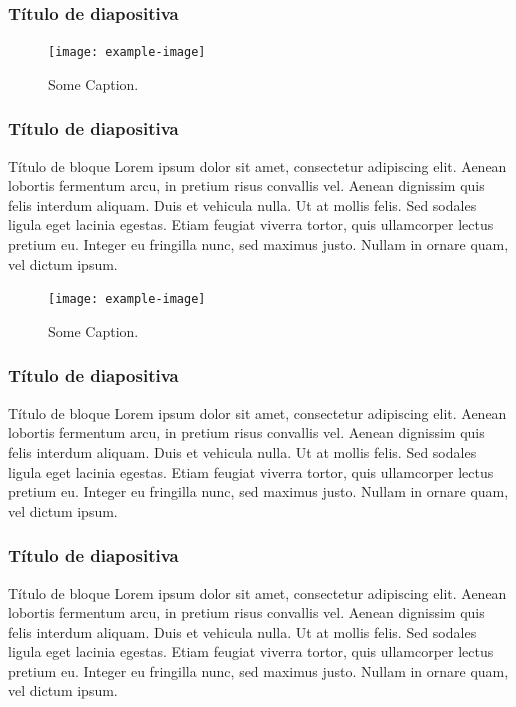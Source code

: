 \documentclass[10pt]{beamer}
\begin{document}
\begin{frame}
  \frametitle{Título de diapositiva}
    \begin{figure}[hbtp]
	    \centering
	    \texttt{[image: example-image]}
        \caption{Some Caption.}
    \end{figure}
\end{frame}

\begin{frame}
    \frametitle{Título de diapositiva}
    \begin{block}{Título de bloque}
        \justifying
        Lorem ipsum dolor sit amet, consectetur adipiscing elit. Aenean lobortis fermentum arcu, in pretium risus convallis vel. Aenean dignissim quis felis interdum aliquam. Duis et vehicula nulla. Ut at mollis felis. Sed sodales ligula eget lacinia egestas. Etiam feugiat viverra tortor, quis ullamcorper lectus pretium eu. Integer eu fringilla nunc, sed maximus justo. Nullam in ornare quam, vel dictum ipsum.
        
        \begin{figure}[hbtp]
	        \centering
	        \texttt{[image: example-image]}
            \caption{Some Caption.}
        \end{figure}
	\end{block}
\end{frame}

\begin{frame}
    \frametitle{Título de diapositiva}
    \begin{block}{Título de bloque}
        \justifying
        Lorem ipsum dolor sit amet, consectetur adipiscing elit. Aenean lobortis fermentum arcu, in pretium risus convallis vel. Aenean dignissim quis felis interdum aliquam. Duis et vehicula nulla. Ut at mollis felis. Sed sodales ligula eget lacinia egestas. Etiam feugiat viverra tortor, quis ullamcorper lectus pretium eu. Integer eu fringilla nunc, sed maximus justo. Nullam in ornare quam, vel dictum ipsum.
	\end{block}
\end{frame}

\begin{frame}
    \frametitle{Título de diapositiva}
    \begin{block}{Título de bloque}
        \justifying
        Lorem ipsum dolor sit amet, consectetur adipiscing elit. Aenean lobortis fermentum arcu, in pretium risus convallis vel. Aenean dignissim quis felis interdum aliquam. Duis et vehicula nulla. Ut at mollis felis. Sed sodales ligula eget lacinia egestas. Etiam feugiat viverra tortor, quis ullamcorper lectus pretium eu. Integer eu fringilla nunc, sed maximus justo. Nullam in ornare quam, vel dictum ipsum.
	\end{block}
\end{frame}
\end{document}
